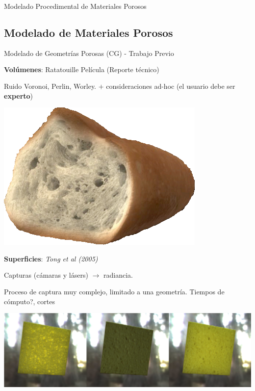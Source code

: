 \documentclass[spanish,unknownkeysallowed,10pt]{beamer}
\begin{document}
\begin{frame}
\begin{block}{}
\begin{center}
\vspace{1cm}
\huge{Modelado Procedimental de Materiales Porosos}
\vspace{1cm}
\end{center}
\end{block}
\end{frame}

\subsection{Modelado de Materiales Porosos}

\begin{frame}{Modelado de Geometrías Porosas (CG) - Trabajo Previo}

\textbf{Volúmenes}: Ratatouille Película (Reporte técnico)

Ruido Voronoi, Perlin, Worley. $+$ consideraciones ad-hoc (el usuario debe ser \textbf{experto})

\centerline{\includegraphics[scale = 0.2]{../figures/ratatouille}}

\textbf{Superficies}: {\it Tong et al (2005)}

Capturas (cámaras y lásers) $\rightarrow$ radiancia.

Proceso de captura muy complejo, limitado a una geometría. Tiempos de cómputo?, cortes

\centerline{\includegraphics[scale = 0.2]{../figures/esponja}}

\end{frame}
\end{document}
